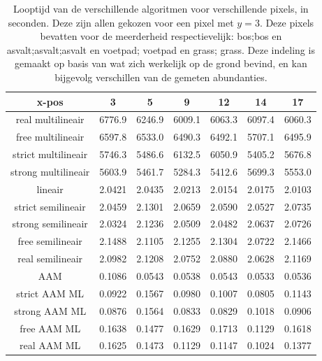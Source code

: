 \documentclass[12pt]{report}
\begin{document}
\begin{table}
\centering
\begin{tabular}{|c|c|c|c|c|c|c|}
\hline
x-pos&3 & 5 & 9 & 12 & 14 & 17 \\
\hline
real multilineair  & 6776.9 & 6246.9 & 6009.1 & 6063.3 & 6097.4 & 6060.3 \\
\hline
free multilineair  & 6597.8 & 6533.0 & 6490.3 & 6492.1 & 5707.1 & 6495.9 \\
\hline
strict multilineair  & 5746.3 & 5486.6 & 6132.5 & 6050.9 & 5405.2 & 5676.8 \\
\hline
strong multilineair  & 5603.9 & 5461.7 & 5284.3 & 5412.6 & 5699.3 & 5553.0 \\
\hline
lineair  & 2.0421 & 2.0435 & 2.0213 & 2.0154 & 2.0175 & 2.0103 \\
\hline
strict semilineair  & 2.0459 & 2.1301 & 2.0659 & 2.0590 & 2.0527 & 2.0735 \\
\hline
strong semilineair  & 2.0324 & 2.1236 & 2.0509 & 2.0482 & 2.0637 & 2.0726 \\
\hline
free semilineair  & 2.1488 & 2.1105 & 2.1255 & 2.1304 & 2.0722 & 2.1466 \\
\hline
real semilineair  & 2.0982 & 2.1208 & 2.0752 & 2.0880 & 2.0628 & 2.1169 \\
\hline
AAM  & 0.1086 & 0.0543 & 0.0538 & 0.0543 & 0.0533 & 0.0536 \\
\hline
strict AAM ML  & 0.0922 & 0.1567 & 0.0980 & 0.1007 & 0.0805 & 0.1143 \\
\hline
strong AAM ML  & 0.0876 & 0.1564 & 0.0833 & 0.0829 & 0.1018 & 0.0906 \\
\hline
free AAM ML  & 0.1638 & 0.1477 & 0.1629 & 0.1713 & 0.1129 & 0.1618 \\
\hline
real AAM ML  & 0.1625 & 0.1473 & 0.1129 & 0.1147 & 0.1024 & 0.1377 \\
\hline
\end{tabular}
\caption{Looptijd van de verschillende algoritmen voor verschillende pixels, in seconden. Deze zijn allen gekozen voor een pixel met $y=3$. Deze pixels bevatten voor de meerderheid respectievelijk: bos;bos en asvalt;asvalt;asvalt en voetpad; voetpad en grass; grass. Deze indeling is gemaakt op basis van wat zich werkelijk op de grond bevind, en kan bijgevolg verschillen van de gemeten abundanties.
\label{table:runtime}}
\end{table}
\end{document}

